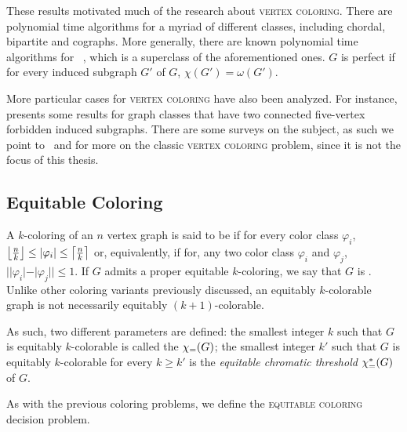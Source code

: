 These results motivated much of the research about \textsc{vertex coloring}.
There are polynomial time algorithms for a myriad of different classes, including chordal, bipartite and cographs.
More generally, there are known polynomial time algorithms for ~\citep{perfect_polynomial}, which is a superclass of the aforementioned ones.
$G$ is perfect if for every induced subgraph $G'$ of $G$, $\chi(G') = \omega(G')$.

More particular cases for \textsc{vertex coloring} have also been analyzed. For instance, \citep{coloring_art} presents some results for graph classes that have two connected five-vertex forbidden induced subgraphs. There are some surveys on the subject, as such we point to~\citep{coloring_survey} and \citep{coloring_survey2} for more on the classic \textsc{vertex coloring} problem, since it is not the focus of this thesis.


\subsection{Equitable Coloring}
A $k$-coloring of an $n$ vertex graph is said to be  if for every color class $\varphi_i$, $\left\lfloor\frac{n}{k}\right\rfloor \leq |\varphi_i| \leq \left\lceil\frac{n}{k}\right\rceil$ or, equivalently, if for, any two color class $\varphi_i$ and $\varphi_j$, $||\varphi_i| - |\varphi_j|| \leq 1$.
If $G$ admits a proper equitable $k$-coloring, we say that $G$ is .
Unlike other coloring variants previously discussed, an equitably $k$-colorable graph is not necessarily equitably $(k+1)$-colorable.

As such, two different parameters are defined: the smallest integer $k$ such that $G$ is equitably $k$-colorable is called the  $\chi_{\mathcal{=}}(G)$; the smallest integer $k'$ such that $G$ is equitably $k$-colorable for every $k \geq k'$ is the \textit{equitable chromatic threshold} $\chi_{\mathcal{=}}^*(G)$ of $G$.

As with the previous coloring problems, we define the \textsc{equitable coloring} decision problem.



